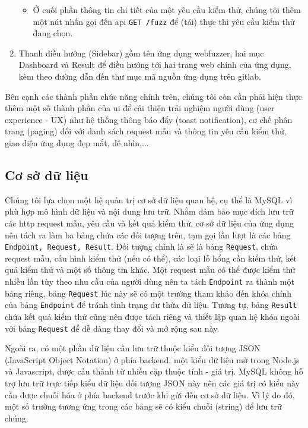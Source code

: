\begin{enumerate}
\begin{itemize}
        \item Ở cuối phần thông tin chi tiết của một yêu cầu kiểm thử, chúng tôi thêm một nút nhấn gọi đến \acrshort{api} \texttt{GET /fuzz} để (tái) thực thi yêu cầu kiểm thử đang chọn.
    \end{itemize}
    \item Thanh điều hướng (Sidebar) gồm tên ứng dụng webfuzzer, hai mục Dashboard và Result để điều hướng tới hai trang web chính của ứng dụng, kèm theo đường dẫn đến thư mục mã nguồn ứng dụng trên gitlab.
\end{enumerate}
Bên cạnh các thành phần chức năng chính trên, chúng tôi còn cần phải hiện thực thêm một số thành phần của \acrshort{ui} để cải thiện trải nghiệm người dùng (user experience - UX) như hệ thống thông báo đẩy (toast notification), cơ chế phân trang (paging) đối với danh sách request mẫu và thông tin yêu cầu kiểm thử, giao diện ứng dụng đẹp mắt, dễ nhìn,...
\subsection{Cơ sở dữ liệu}
Chúng tôi lựa chọn một hệ quản trị cơ sở dữ liệu quan hệ, cụ thể là MySQL vì phù hợp mô hình dữ liệu và nội dung lưu trữ. Nhằm đảm bảo mục đích lưu trữ các \acrshort{http} request mẫu, yêu cầu và kết quả kiểm thử, cơ sở dữ liệu của ứng dụng nên tách ra làm ba bảng chứa các đối tượng trên, tạm gọi lần lượt là các bảng \texttt{Endpoint, Request, Result}. Đối tượng chính là sẽ là bảng \texttt{Request}, chứa request mẫu, cấu hình kiểm thử (nếu có thể), các loại lỗ hổng cần kiểm thử, kết quả kiểm thử và một số thông tin khác. Một request mẫu có thể được kiểm thử nhiều lần tùy theo nhu cầu của người dùng nên ta tách \texttt{Endpoint} ra thành một bảng riêng, bảng \texttt{Request} lúc này sẽ có một trường tham khảo đến khóa chính của bảng \texttt{Endpoint} để tránh tình trạng dư thừa dữ liệu. Tương tự, bảng \texttt{Result} chứa kết quả kiểm thử cũng nên được tách riêng và thiết lập quan hệ khóa ngoài với bảng \texttt{Request} để dễ dàng thay đổi và mở rộng sau này.\par
Ngoài ra, có một phần dữ liệu cần lưu trữ thuộc kiểu đối tượng JSON (JavaScript Object Notation) ở phía backend, một kiểu dữ liệu mở trong Node.js và Javascript, được cấu thành từ nhiều cặp thuộc tính - giá trị. MySQL không hỗ trợ lưu trữ trực tiếp kiểu dữ liệu đối tượng JSON này nên các giá trị có kiểu này cần được chuỗi hóa ở phía backend trước khi gửi đến cơ sở dữ liệu. Vì lý do đó, một số trường tương ứng trong các bảng sẽ có kiểu chuỗi (string) để lưu trữ chúng.